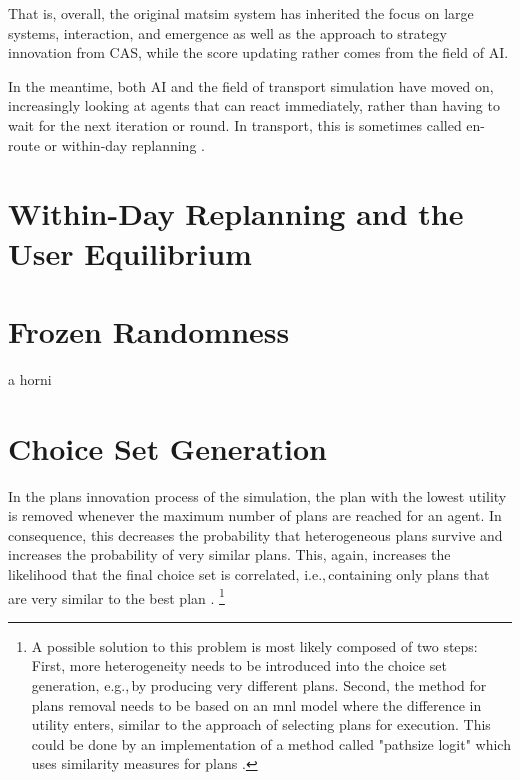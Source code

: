 That is, overall, the original \gls{matsim} system has inherited the focus on large systems, interaction, and emergence as well as the approach to strategy innovation from CAS, while the score updating rather comes from the field of AI.

In the meantime, both AI and the field of transport simulation have moved on, increasingly looking at agents that can react immediately, rather than having to wait for the next iteration or round.  In transport, this is sometimes called en-route or within-day replanning \citep[e.g.,][]{EmmerinkEtAl_TransResC_1995,balijepalli-2007}.




\section{Within-Day Replanning and the User Equilibrium}
\label{sec:researchavenues-withinday}

\vfill\eject
\section{Frozen Randomness}

a horni

\vfill\eject
\section{Choice Set Generation}
\label{sec:choicesets}


In the plans innovation process of the simulation, the plan with the lowest utility is removed whenever the maximum number of plans are reached for an agent. In consequence, this decreases the probability that heterogeneous plans survive and increases the probability of very similar plans. This, again, increases the likelihood that the final choice set is correlated, i.e.,\,containing only plans that are very similar to the best plan \citep[see][for a review on correlation of 
 routes]{Prato2009ChoiceModellingSurvey}.%
 \footnote{
 A possible solution to this problem is most likely composed of two steps:
 First, more heterogeneity needs to be introduced into the choice set generation, e.g.,\,by producing very different plans.
 Second, the method for plans removal needs to be based on an \gls{mnl} model where the difference in utility enters, similar to the approach of selecting plans for execution. This could be done by an implementation of a method called "pathsize logit" which uses similarity measures for plans \citep[see][for a possible solution in route choice]{FrejingerBierlaire2007PathSizeLogit, BenAkivaBierlaiere1999DiscreteChoice}.
 }

